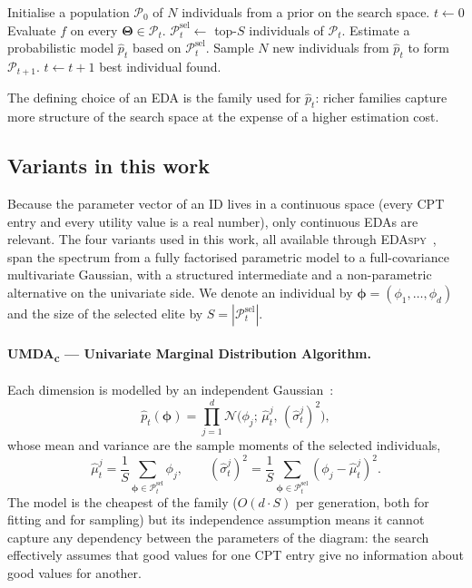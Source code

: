 \begin{algorithm}\hfill
\label{alg:eda}
\begin{algorithmic}[1]
\State Initialise a population $\mathcal{P}_0$ of $N$ individuals from a prior on the search space.
\State $t \leftarrow 0$
\Repeat
    \State Evaluate $f$ on every $\boldsymbol{\Theta}\in\mathcal{P}_t$.
    \State $\mathcal{P}_t^{\text{sel}} \leftarrow$ top-$S$ individuals of $\mathcal{P}_t$.
    \State Estimate a probabilistic model $\hat{p}_t$ based on
           $\mathcal{P}_t^{\text{sel}}$.
    \State Sample $N$ new individuals from $\hat{p}_t$ to form
           $\mathcal{P}_{t+1}$.
    \State $t \leftarrow t+1$
\State \Return best individual found.
\end{algorithmic}
\end{algorithm}

The defining choice of an EDA is the family used for $\hat{p}_t$:
richer families capture more structure of the search space at the
expense of a higher estimation cost.

\subsection{Variants in this work}

Because the parameter vector of an ID lives in a continuous space
(every CPT entry and every utility value is a real number), only
continuous EDAs are relevant. The four variants used in this work,
all available through \textsc{EDAspy}~\cite{soloviev2024edaspy}, span the spectrum from a fully factorised parametric model to a
full-covariance multivariate Gaussian, with a structured intermediate
and a non-parametric alternative on the univariate side. We denote an individual by $\boldsymbol{\phi}=(\phi_1,\ldots,\phi_d)$
and the size of the selected elite by
$S=|\mathcal{P}_t^{\text{sel}}|$.

\paragraph*{UMDA\textsubscript{c} --- Univariate Marginal Distribution
Algorithm.} Each dimension is modelled by an independent
Gaussian~\cite{larranaga2002eda}:
\[
    \hat{p}_t(\boldsymbol{\phi})
    = \prod_{j=1}^{d}
    \mathcal{N}\!\bigl(\phi_j;\,
    \hat{\mu}_t^{j},\,(\hat{\sigma}_t^{j})^{2}\bigr),
\]
whose mean and variance are the sample moments of the selected individuals,
\[
    \hat{\mu}_t^{j}
    = \frac{1}{S}\!\sum_{\boldsymbol{\phi}\in\mathcal{P}_t^{\text{sel}}}\!\phi_j,
    \qquad
    (\hat{\sigma}_t^{j})^{2}
    = \frac{1}{S}\!\sum_{\boldsymbol{\phi}\in\mathcal{P}_t^{\text{sel}}}\!
    (\phi_j - \hat{\mu}_t^{j})^{2}.
\]
The model is the cheapest of the family ($O(d\cdot S)$ per generation,
both for fitting and for sampling) but its independence assumption
means it cannot capture any dependency between the parameters of the
diagram: the search effectively assumes that good values for one CPT
entry give no information about good values for another.
